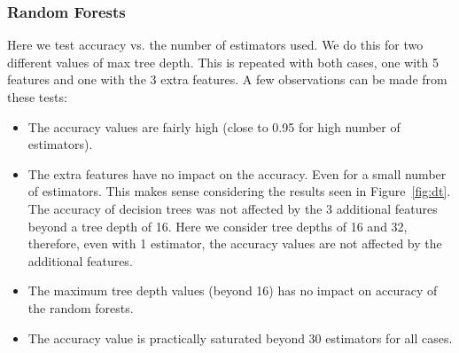 \documentclass{article}
\begin{document}
\subsubsection{Random Forests}

Here we test accuracy vs. the number of estimators used. We do this for two different values of max tree depth. This is repeated with both cases, one with 5 features and one with the 3 extra features. A few observations can be made from these tests:
\begin{itemize}
\item The accuracy values are fairly high (close to 0.95 for high number of estimators).
\item The extra features have no impact on the accuracy. Even for a small number of estimators. This makes sense considering the results seen in Figure~\ref{fig:dt}. The accuracy of decision trees was not affected by the 3 additional features beyond a tree depth of 16. Here we consider tree depths of 16 and 32, therefore, even with 1 estimator, the accuracy values are not affected by the additional features.
\item The maximum tree depth values (beyond 16) has no impact on accuracy of the random forests.
\item The accuracy value is practically saturated beyond 30 estimators for all cases.
\end{itemize}
\end{document}
